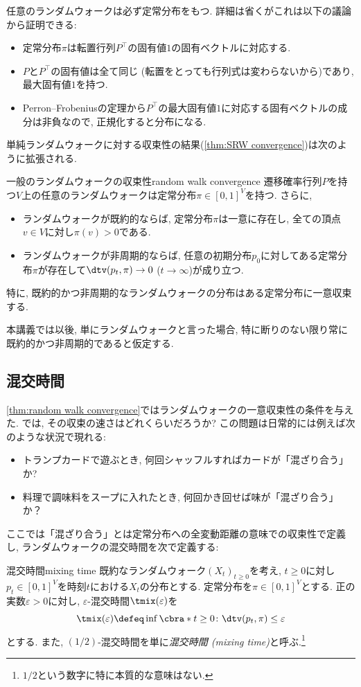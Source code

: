   任意のランダムウォークは必ず定常分布をもつ.
  詳細は省くがこれは以下の議論から証明できる:
    \begin{itemize}
    \item 定常分布$\pi$は転置行列$P^{\top}$の固有値$1$の固有ベクトルに対応する.
    \item $P$と$P^\top$の固有値は全て同じ (転置をとっても行列式は変わらないから)であり, 最大固有値$1$を持つ.
    \item Perron--Frobeniusの定理から$P^\top$の最大固有値$1$に対応する固有ベクトルの成分は非負なので, 正規化すると分布になる.
    \end{itemize}
  単純ランダムウォークに対する収束性の結果(\cref{thm:SRW convergence})は次のように拡張される.
  \begin{theorem}{一般のランダムウォークの収束性}{random walk convergence}
      遷移確率行列$P$を持つ$V$上の任意のランダムウォークは定常分布$\pi \in [0,1]^V$を持つ.
      さらに,
      \begin{itemize}
      \item ランダムウォークが既約的ならば, 定常分布$\pi$は一意に存在し, 全ての頂点$v\in V$に対し$\pi(v)>0$である.
      \item ランダムウォークが非周期的ならば, 任意の初期分布$p_0$に対してある定常分布$\pi$が存在して$\dtv(p_t,\pi)\to 0$ ($t\to\infty$)が成り立つ.
      \end{itemize}

      特に, 既約的かつ非周期的なランダムウォークの分布はある定常分布に一意収束する.
  \end{theorem}

  本講義では以後, 単にランダムウォークと言った場合, 特に断りのない限り常に既約的かつ非周期的であると仮定する.

\subsection{混交時間}
\cref{thm:random walk convergence}ではランダムウォークの一意収束性の条件を与えた.
では, その収束の速さはどれくらいだろうか?
この問題は日常的には例えば次のような状況で現れる:
\begin{itemize}
  \item トランプカードで遊ぶとき, 何回シャッフルすればカードが「混ざり合う」か?
  \item 料理で調味料をスープに入れたとき, 何回かき回せば味が「混ざり合う」か？
\end{itemize}

ここでは「混ざり合う」とは定常分布への全変動距離の意味での収束性で定義し,
ランダムウォークの混交時間を次で定義する:
\begin{definition}{混交時間}{mixing time}
  既約なランダムウォーク$(X_t)_{t\ge 0}$を考え, $t\ge 0$に対し
  $p_t \in [0,1]^V$を時刻$t$における$X_t$の分布とする.
  定常分布を$\pi \in [0,1]^V$とする.
  正の実数$\varepsilon > 0$に対し, $\varepsilon$-混交時間$\tmix(\varepsilon)$を
  \[
    \tmix(\varepsilon) \defeq \inf\cbra*{ t \ge 0 \colon \dtv(p_t, \pi) \le \varepsilon}
  \]
  とする.
  また, $(1/2)$-混交時間を単に\emph{混交時間 (mixing time)}と呼ぶ.\footnote{$1/2$という数字に特に本質的な意味はない.}
\end{definition}

